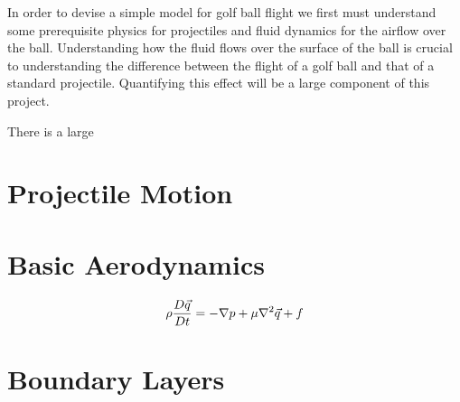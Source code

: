 In order to devise a simple model for golf ball flight we first must understand some
prerequisite physics for projectiles and fluid dynamics for the airflow over the ball. Understanding
how the fluid flows over the surface of the ball is crucial to understanding the difference between
the flight of a golf ball and that of a standard projectile. Quantifying this effect will be a large
component of this project.

There is a large 

\section{Projectile Motion}

\section{Basic Aerodynamics}

\begin{equation}
\rho \frac{D\vec{q}}{Dt} = - \nabla p + \mu \nabla^2 \vec{q} + f
\end{equation}

\section{Boundary Layers}

